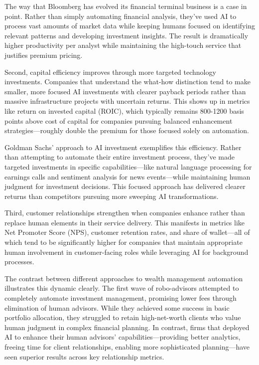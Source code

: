 \documentclass[
  Letterpaper,
]{scrbook}
\begin{document}
The way that Bloomberg has evolved its
financial terminal business is a case in point. Rather than simply
automating financial analysis, they've used AI to process vast amounts
of market data while keeping humans focused on identifying relevant
patterns and developing investment insights. The result is dramatically
higher productivity per analyst while maintaining the high-touch service
that justifies premium pricing.

Second, capital efficiency improves
through more targeted technology investments. Companies that understand
the what-how
distinction tend to
make smaller, more focused AI investments with clearer payback periods
rather than massive infrastructure projects with uncertain returns. This
shows up in metrics like return on invested
capital (ROIC), which
typically remains 800-1200 basis points above cost of capital for
companies pursuing balanced
enhancement
strategies---roughly double the premium for those focused solely on
automation.

Goldman Sachs' approach to AI
investment exemplifies this efficiency. Rather than attempting to
automate their entire investment process, they've made targeted
investments in specific capabilities---like natural language processing
for earnings calls and sentiment analysis for news events---while
maintaining human judgment for investment decisions. This focused
approach has delivered clearer returns than competitors pursuing more
sweeping AI transformations.

Third, customer relationships strengthen when companies enhance rather
than replace human elements in their service delivery. This manifests in
metrics like Net Promoter Score (NPS), customer retention rates, and
share of wallet---all of which tend to be significantly higher for
companies that maintain appropriate human involvement in customer-facing
roles while leveraging AI for background processes.

The contrast between different approaches to wealth management
automation illustrates this dynamic clearly. The first wave of
robo-advisors attempted to completely automate investment
management, promising lower fees through
elimination of human advisors. While they achieved some success in basic
portfolio allocation, they struggled to retain high-net-worth clients
who value human judgment in complex financial planning. In contrast,
firms that deployed AI to enhance their human advisors'
capabilities---providing better analytics, freeing time for client
relationships, enabling more sophisticated planning---have seen superior
results across key relationship metrics.
\end{document}

